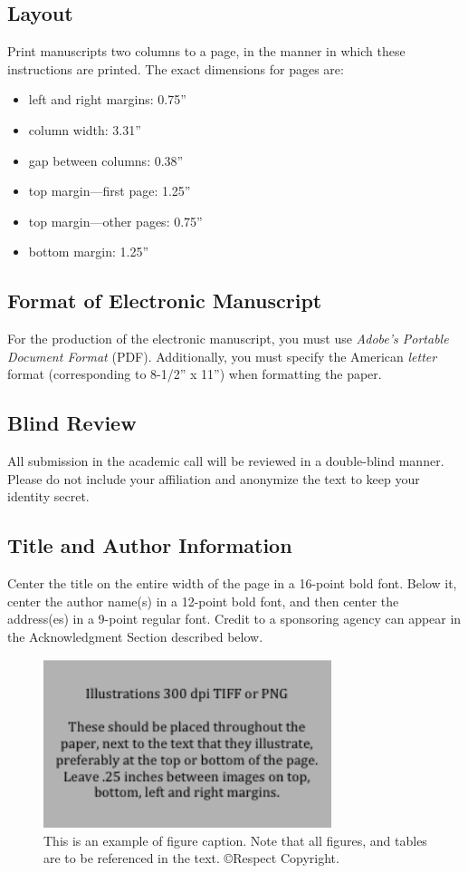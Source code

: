 \documentclass[letterpaper]{article}
\begin{document}
\subsection{Layout}

Print manuscripts two columns to a page, in the manner in which these instructions are printed. The exact dimensions for pages are:
\begin{itemize}
\item left and right margins: 0.75''
\item column width: 3.31''
\item gap between columns: 0.38''
\item top margin—first page: 1.25''
\item top margin—other pages: 0.75''
\item bottom margin: 1.25''
\end{itemize}

\subsection{Format of Electronic Manuscript}

For the production of the electronic manuscript, you must use {\em Adobe's Portable Document Format} (PDF). Additionally, you must specify the American {\em letter} format (corresponding to 8-1/2'' x 11'') when formatting the paper.

\subsection{Blind Review}

All submission in the academic call will be reviewed in a double-blind manner.  Please do not include your affiliation and anonymize the text to keep your identity secret.

\subsection{Title and Author Information}

Center the title on the entire width of the page in a 16-point bold font. Below it, center the author name(s) in a 12-point bold font, and then center the address(es) in a 9-point regular font. Credit to a sponsoring agency can appear in the Acknowledgment Section described below.

\begin{figure}[h]
\includegraphics[width=3.31in]{figure.png}
\caption{This is an example of figure caption. Note that all figures, and tables are to be referenced in the text. \copyright Respect Copyright.}
\end{figure}
\end{document}
